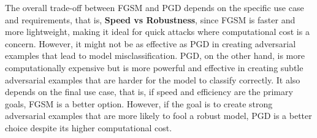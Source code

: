 \documentclass{article}
\begin{document}
The overall trade-off between FGSM and PGD depends on the specific use case and requirements, that is, \textbf{Speed vs Robustness},
since FGSM is faster and more lightweight, making it ideal for quick attacks where computational cost is a concern.
However, it might not be as effective as PGD in creating adversarial examples that lead to model misclassification.
PGD, on the other hand, is more computationally expensive but is more powerful and effective in creating subtle
adversarial examples that are harder for the model to classify correctly. It also depends on the final use case, that is,
if speed and efficiency are the primary goals, FGSM is a better option. However, if the goal is to create strong
adversarial examples that are more likely to fool a robust model, PGD is a better choice despite its higher
computational cost.





















\newpage

 
\end{document}
